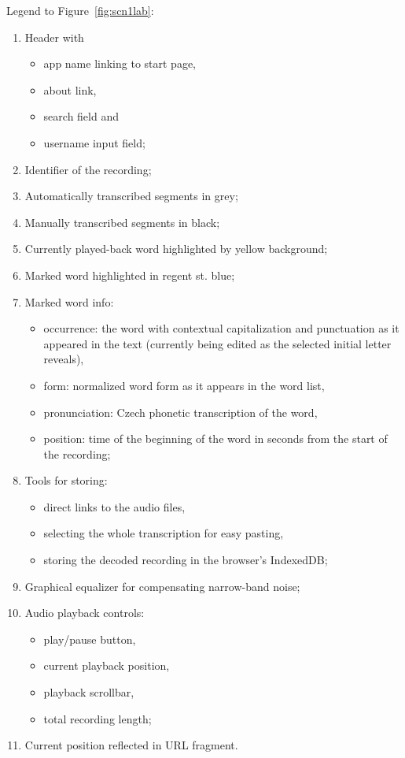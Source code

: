 \documentclass{svproc}
\begin{document}
Legend to Figure~\ref{fig:scn1lab}:
\begin{enumerate}
\item{
    Header with
    \begin{itemize}
    \item{app name linking to start page,}
    \item{about link,}
    \item{search field and}
    \item{username input field;}
    \end{itemize}
}
\item{Identifier of the recording;}
\item{Automatically transcribed segments in grey;}
\item{Manually transcribed segments in black;}
\item{Currently played-back word highlighted by yellow background;}
\item{Marked word highlighted in regent st. blue;}
\item{
    Marked word info:
    \begin{itemize}
    \item{
        occurrence: the word with contextual capitalization and
        punctuation as it appeared in the text (currently being edited as the
        selected initial letter reveals),
    }
    \item{form: normalized word form as it appears in the word list,}
    \item{pronunciation: Czech phonetic transcription of the word,}
    \item{
        position: time of the beginning of the word in seconds from the
        start of the recording;
    }
    \end{itemize}
}
\item{
    Tools for storing:
    \begin{itemize}
    \item{direct links to the audio files,}
    \item{selecting the whole transcription for easy pasting,}
    \item{storing the decoded recording in the browser's IndexedDB;}
    \end{itemize}
}
\item{Graphical equalizer for compensating narrow-band noise;}
\item{
    Audio playback controls:
    \begin{itemize}
    \item{play/pause button,}
    \item{current playback position,}
    \item{playback scrollbar,}
    \item{total recording length;}
    \end{itemize}
}
\item{Current position reflected in URL fragment.}
\end{enumerate}
\end{document}
